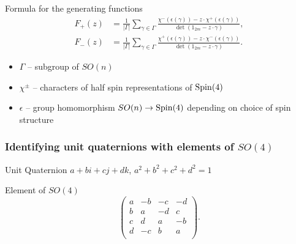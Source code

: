 \documentclass{beamer}
\def\Spin{{\rm Spin}}
\begin{document}
\begin{frame}
	\begin{block}{Formula for the generating functions}
		\begin{align*}
F_+ (z) &= \frac{1}{| \Gamma |} \sum_{\gamma \in \Gamma}  \frac{\chi^-(\epsilon(\gamma)) - z \cdot \chi^+ (\epsilon(\gamma))}{\det(1_{2m} - z \cdot \gamma)}, \\ \label{Spmultgen2}
F_-(z) &= \frac{1}{| \Gamma |} \sum_{\gamma \in \Gamma} \frac{\chi^+(\epsilon(\gamma)) - z \cdot \chi^- (\epsilon(\gamma))}{\det(1_{2m} - z \cdot \gamma)}.
		\end{align*}
	\end{block}
	
	\begin{block}{}
	\begin{itemize}
		\item $\Gamma$ -- subgroup of $SO(n)$
		\item $\chi^{\pm}$ -- characters of half spin representations of $\Spin(4)$
		\item $\epsilon$ -- group homomorphism $SO(n) \rightarrow \Spin(4)$ depending on choice of spin structure
	\end{itemize}
	\end{block}
\end{frame}

\begin{frame}
	\frametitle{Identifying unit quaternions with elements of  $SO(4)$}
	\begin{block}{Unit Quaternion}
	$a + bi + cj + dk$, $a^2 + b^2 + c^2 + d^2 = 1$
	\end{block}
	\begin{block}{Element of $SO(4)$}
	\[
\left(
\begin{array}{cccc}
a & -b & -c & -d \\
b & a & -d & c \\
c & d & a & -b \\
d & -c & b & a \\
\end{array}
\right).
\]
	\end{block}
\end{frame}
\end{document}
